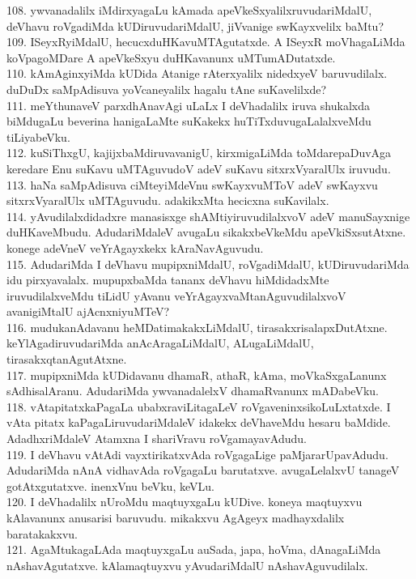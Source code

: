 \documentclass{article}
\begin{document}
108. ywvanadalilx iMdirxyagaLu kAmada apeVkeSxyalilxruvudariMdalU, deVhavu roVgadiMda kUDiruvudariMdalU, jiVvanige swKayxvelilx baMtu?\\
109. ISeyxRyiMdalU, hecucxduHKavuMTAgutatxde. A ISeyxR moVhagaLiMda koVpagoMDare A apeVkeSxyu duHKavanunx uMTumADutatxde.\\
110. kAmAginxyiMda kUDida Atanige rAterxyalilx nidedxyeV baruvudilalx. duDuDx saMpAdisuva yoVcaneyalilx hagalu tAne suKavelilxde?\\
111. meYthunaveV parxdhAnavAgi uLaLx I deVhadalilx iruva shukalxda biMdugaLu beverina hanigaLaMte suKakekx huTiTxduvugaLalalxveMdu tiLiyabeVku.\\
112. kuSiThxgU, kajijxbaMdiruvavanigU, kirxmigaLiMda toMdarepaDuvAga keredare Enu suKavu uMTAguvudoV adeV suKavu sitxrxVyaralUlx iruvudu.\\
113. haNa saMpAdisuva ciMteyiMdeVnu swKayxvuMToV adeV swKayxvu sitxrxVyaralUlx uMTAguvudu. adakikxMta hecicxna suKavilalx.\\
114. yAvudilalxdidadxre manasisxge shAMtiyiruvudilalxvoV adeV manuSayxnige duHKaveMbudu. AdudariMdaleV avugaLu sikakxbeVkeMdu apeVkiSxsutAtxne. konege adeVneV veYrAgayxkekx kAraNavAguvudu.\\
115. AdudariMda I deVhavu mupipxniMdalU, roVgadiMdalU, kUDiruvudariMda idu pirxyavalalx. mupupxbaMda tananx deVhavu hiMdidadxMte iruvudilalxveMdu tiLidU yAvanu veYrAgayxvaMtanAguvudilalxvoV avanigiMtalU ajAcnxniyuMTeV?\\
116. mudukanAdavanu heMDatimakakxLiMdalU, tirasakxrisalapxDutAtxne. keYlAgadiruvudariMda anAcAragaLiMdalU, ALugaLiMdalU, tirasakxqtanAgutAtxne.\\
117. mupipxniMda kUDidavanu dhamaR, athaR, kAma, moVkaSxgaLanunx sAdhisalAranu. AdudariMda ywvanadalelxV dhamaRvanunx mADabeVku.\\
118. vAtapitatxkaPagaLa ubabxraviLitagaLeV roVgaveninxsikoLuLxtatxde. I vAta pitatx kaPagaLiruvudariMdaleV idakekx deVhaveMdu hesaru baMdide. AdadhxriMdaleV Atamxna I shariVravu roVgamayavAdudu.\\
119. I deVhavu vAtAdi vayxtirikatxvAda roVgagaLige paMjararUpavAdudu. AdudariMda nAnA vidhavAda roVgagaLu barutatxve. avugaLelalxvU tanageV gotAtxgutatxve. inenxVnu beVku, keVLu.\\
120. I deVhadalilx nUroMdu maqtuyxgaLu kUDive. koneya maqtuyxvu kAlavanunx anusarisi baruvudu. mikakxvu AgAgeyx madhayxdalilx baratakakxvu.\\
121. AgaMtukagaLAda maqtuyxgaLu auSada, japa, hoVma, dAnagaLiMda nAshavAgutatxve. kAlamaqtuyxvu yAvudariMdalU nAshavAguvudilalx.\\
\end{document}
